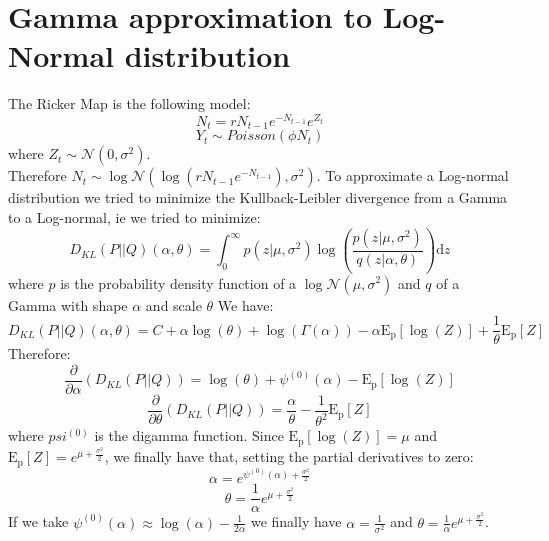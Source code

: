 \documentclass{article}
\begin{document}
\section*{Gamma approximation to Log-Normal distribution}
The Ricker Map is the following model:
\begin{equation*}
N_t = rN_{t-1}e^{-N_{t-1}}e^{Z_t}
\end{equation*}
\begin{equation*}
Y_t \sim Poisson(\phi N_t)
\end{equation*}
where $Z_t \sim \mathcal{N} (0,\sigma^2)$.\\
Therefore $N_t \sim \log\mathcal{N} (\log{(rN_{t-1}e^{-N_{t-1}})},\sigma^2)$. To approximate a Log-normal distribution we tried to minimize the Kullback-Leibler divergence from a Gamma to a Log-normal, ie we tried to minimize:
\begin{equation*}
D_{KL}(P||Q)(\alpha, \theta) = \int_{0}^{\infty}{p(z|\mu, \sigma^2)\log(\frac{p(z|\mu, \sigma^2)}{q(z|\alpha, \theta)})\mathrm{d}z}
\end{equation*}
where $p$ is the probability density function of a $\log\mathcal{N}(\mu, \sigma^2)$ and $q$ of a Gamma with shape $\alpha$ and scale $\theta$
We have:
\begin{equation*}
D_{KL}(P||Q)(\alpha, \theta) = C + \alpha\log(\theta) + \log(\Gamma(\alpha)) - \alpha\mathrm{E_p}[\log(Z)] + \frac{1}{\theta}\mathrm{E_p}[Z]
\end{equation*}
Therefore:
\begin{equation*}
\frac{\partial }{\partial \alpha}(D_{KL}(P||Q)) = \log(\theta) + \psi^{(0)}(\alpha)-\mathrm{E_p}[\log(Z)]
\end{equation*}
\begin{equation*}
\frac{\partial }{\partial \theta}(D_{KL}(P||Q)) = \frac{\alpha}{\theta} - \frac{1}{\theta^2}\mathrm{E_p}[Z]
\end{equation*}
where $psi^{(0)}$ is the digamma function.
\clearpage
Since $\mathrm{E_p}[\log(Z)]=\mu$ and $\mathrm{E_p}[Z] = e^{\mu+\frac{\sigma^2}{2}}$, we finally have that, setting the partial derivatives to zero:
\begin{equation*}
\alpha=e^{\psi^{(0)}(\alpha)+\frac{\sigma^2}{2}}
\end{equation*}
\begin{equation*}
\theta=\frac{1}{\alpha}e^{\mu+\frac{\sigma^2}{2}}
\end{equation*}
If we take $\psi^{(0)}(\alpha) \approx \log(\alpha)-\frac{1}{2\alpha}$ we finally have $\alpha =\frac{1}{\sigma^2}$ and $\theta=\frac{1}{\alpha}e^{\mu+\frac{\sigma^2}{2}}$.
\end{document}
